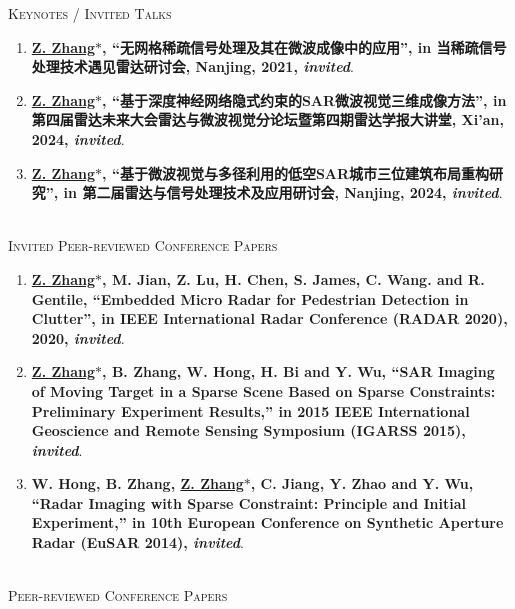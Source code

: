 \documentclass[paper=a4,fontsize=11pt]{scrartcl}
\begin{document}
\textsc{Keynotes / Invited Talks}

\begin{enumerate}
	
	\item \textbf{\underline{Z. Zhang$\ast$}, ``无网格稀疏信号处理及其在微波成像中的应用'', in 当稀疏信号处理技术遇见雷达研讨会, Nanjing, 2021, \emph{invited}}.
	
	\item \textbf{\underline{Z. Zhang$\ast$}, ``基于深度神经网络隐式约束的SAR微波视觉三维成像方法'', in 第四届雷达未来大会雷达与微波视觉分论坛暨第四期雷达学报大讲堂, Xi'an, 2024, \emph{invited}}.
	
	\item \textbf{\underline{Z. Zhang$\ast$}, ``基于微波视觉与多径利用的低空SAR城市三位建筑布局重构研究'', in 第二届雷达与信号处理技术及应用研讨会, Nanjing, 2024, \emph{invited}}.
	
\end{enumerate}

~\\

\textsc{Invited Peer-reviewed Conference Papers}

\begin{enumerate}
	
	\item \textbf{\underline{Z. Zhang$\ast$}, M. Jian, Z. Lu, H. Chen, S. James, C. Wang. and R. Gentile, ``Embedded Micro Radar for Pedestrian Detection in Clutter'', in IEEE International Radar Conference (RADAR 2020), 2020, \emph{invited}}.
	
	\item \textbf{\underline{Z. Zhang$\ast$}, B. Zhang, W. Hong, H. Bi and Y. Wu, ``SAR Imaging of Moving Target in a Sparse Scene Based on Sparse Constraints: Preliminary Experiment Results,'' in 2015 IEEE International Geoscience and Remote Sensing Symposium (IGARSS 2015), \emph{invited}}.
	
	\item \textbf{W. Hong, B. Zhang, \underline{Z. Zhang$\ast$}, C. Jiang, Y. Zhao and Y. Wu, ``Radar Imaging with Sparse Constraint: Principle and Initial Experiment,'' in 10th European Conference on Synthetic Aperture Radar (EuSAR 2014), \emph{invited}}.
	
	
\end{enumerate}

~\\

\textsc{Peer-reviewed Conference Papers}
\end{document}
